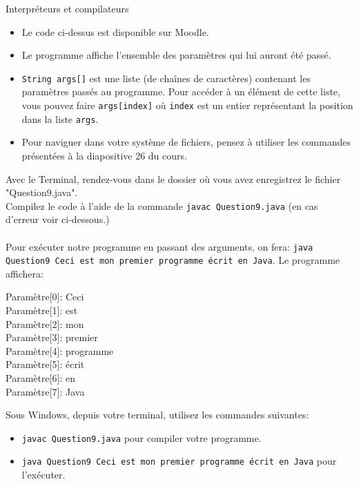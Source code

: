 \begin{section}{Interpréteurs et compilateurs}
\begin{Exercice}[10 minutes]
        \begin{conseil}
            \begin{itemize}
                \item Le code ci-dessus est disponible sur Moodle.
                \item Le programme affiche l'ensemble des paramètres qui lui auront été passé.
                \item \lstinline{String args[]} est une liste (de chaînes de caractères) contenant les paramètres passés au programme. Pour accéder à un élément de cette liste, vous pouvez faire \lstinline{args[index]} où \lstinline{index} est un entier représentant la position dans la liste \lstinline{args}.
                \item Pour naviguer dans votre système de fichiers, pensez à utiliser les commandes présentées à la diapositive 26 du cours.
            \end{itemize}
        \end{conseil}
        \begin{solution}
            Avec le Terminal, rendez-vous dans le dossier où vous avez enregistrez le fichier "Question9.java".\\
            Compilez le code à l'aide de la commande \lstinline{javac Question9.java} (en cas d'erreur voir ci-dessous.)\\\\
            Pour exécuter notre programme en passant des arguments, on fera: \lstinline{java Question9 Ceci est mon premier programme écrit en Java}. Le programme affichera:\\
            \parbox{\textwidth}{
                Paramètre[0]: Ceci\\
                Paramètre[1]: est\\
                Paramètre[2]: mon\\
                Paramètre[3]: premier\\
                Paramètre[4]: programme\\
                Paramètre[5]: écrit\\
                Paramètre[6]: en\\
                Paramètre[7]: Java\\
            }
            Sous Windows, depuis votre terminal, utilisez les commandes suivantes:
            \begin{itemize}
                \item \lstinline{javac Question9.java} pour compiler votre programme.
                \item \lstinline{java Question9 Ceci est mon premier programme écrit en Java} pour l'exécuter.\\
            \end{itemize}


\end{solution}
\end{Exercice}
\end{section}
